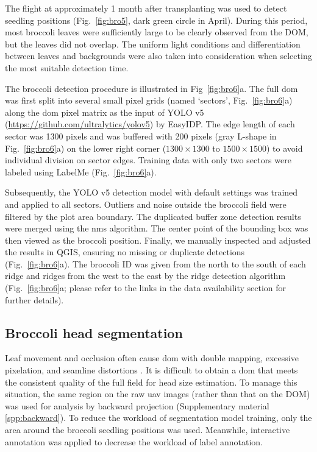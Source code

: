 The flight at approximately 1 month after transplanting was used to detect seedling positions (Fig.~\ref{fig:bro5}, dark green circle in April). During this period, most broccoli leaves were sufficiently large to be clearly observed from the DOM, but the leaves did not overlap. The uniform light conditions and differentiation between leaves and backgrounds were also taken into consideration when selecting the most suitable detection time.

The broccoli detection procedure is illustrated in Fig~\ref{fig:bro6}a. The full \gls{dom} was first split into several small pixel grids (named `sectors', Fig.~\ref{fig:bro6}a) along the \gls{dom} pixel matrix as the input of YOLO v5 (\url{https://github.com/ultralytics/yolov5}) by EasyIDP. The edge length of each sector was 1300 pixels and was buffered with 200 pixels (gray L-shape in Fig.~\ref{fig:bro6}a) on the lower right corner ($1300 \times 1300$ to $1500 \times 1500$) to avoid individual division on sector edges. Training data with only two sectors were labeled using LabelMe (Fig.~\ref{fig:bro6}a). 

Subsequently, the YOLO v5 detection model with default settings was trained and applied to all sectors. Outliers and noise outside the broccoli field were filtered by the plot area boundary. The duplicated buffer zone detection results were merged using the \gls{nms} algorithm. The center point of the bounding box was then viewed as the broccoli position. Finally, we manually inspected and adjusted the results in QGIS, ensuring no missing or duplicate detections (Fig.~\ref{fig:bro6}a). The broccoli ID was given from the north to the south of each ridge and ridges from the west to the east by the ridge detection algorithm (Fig.~\ref{fig:bro6}a; please refer to the links in the data availability section for further details). 

\subsection{Broccoli head segmentation} \label{sec:seg}

Leaf movement and occlusion often cause \gls{dom} with double mapping, excessive pixelation, and seamline distortions \citep{lin_new_2021}. It is difficult to obtain a \gls{dom} that meets the consistent quality of the full field for head size estimation. To manage this situation, the same region on the raw \gls{uav} images (rather than that on the DOM) was used for analysis by backward projection \citep{wang_easyidp_2021} (Supplementary material \ref{spp:backward}). To reduce the workload of segmentation model training, only the area around the broccoli seedling positions was used. Meanwhile, interactive annotation \citep{ghosal_weakly_2019} was applied to decrease the workload of label annotation. 

